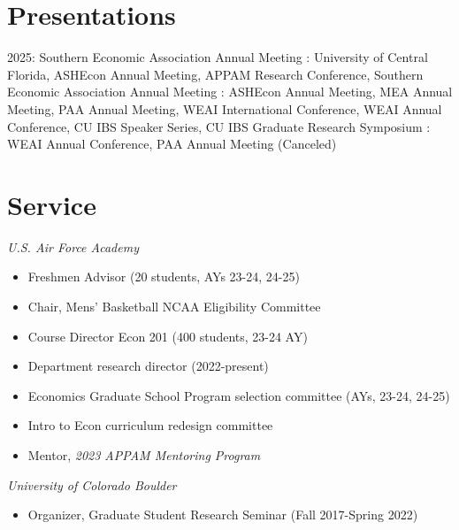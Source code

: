 \documentclass[letterpaper]{article}
\begin{document}
\section*{Presentations}
2025: Southern Economic Association Annual Meeting
\newline{}: University of Central Florida, ASHEcon Annual Meeting, APPAM Research Conference, Southern Economic Association Annual Meeting
\newline{}: ASHEcon Annual Meeting, MEA Annual Meeting, PAA Annual Meeting, WEAI International Conference, WEAI Annual Conference, CU IBS Speaker Series, CU IBS Graduate Research Symposium
\newline{}: WEAI Annual Conference, PAA Annual Meeting (Canceled)

\section*{Service}
\textit{U.S. Air Force Academy}
  \begin{itemize}[topsep=2pt,itemsep=-1pt,leftmargin=1em]
    \item[] Freshmen Advisor (20 students, AYs 23-24, 24-25)
    \item[] Chair, Mens' Basketball NCAA Eligibility Committee
    \item[] Course Director Econ 201 (400 students, 23-24 AY)
    \item[] Department research director (2022-present)
    \item[] Economics Graduate School Program selection committee (AYs, 23-24, 24-25)
    \item[] Intro to Econ curriculum redesign committee
    \item[] Mentor, \textit{2023 APPAM Mentoring Program}
  \end{itemize}
  \vspace*{.5em}
\textit{University of Colorado Boulder}
  \begin{itemize}[topsep=2pt,itemsep=-1pt,leftmargin=1em]
    \item[] Organizer, Graduate Student Research Seminar (Fall 2017-Spring 2022)
  \end{itemize}
\end{document}
